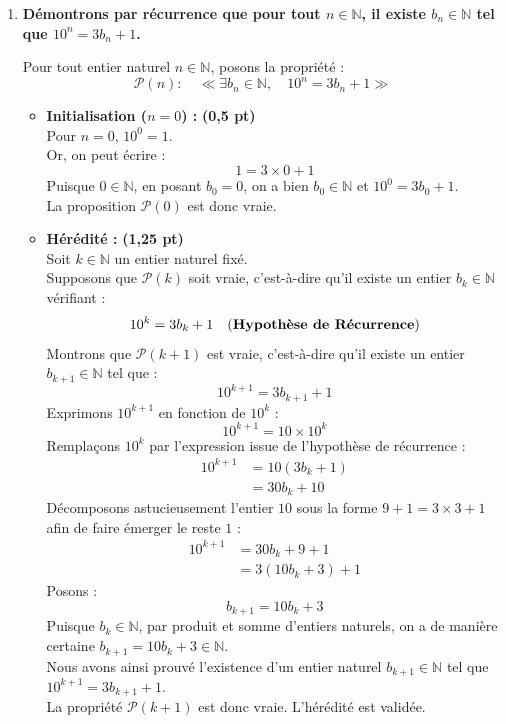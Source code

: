 \documentclass[11pt,a4paper]{article}
\newcommand{\bareme}[1]{\hfill\textbf{\textcolor{secondary}{\sffamily[#1]}}}
\newcommand{\pts}[1]{\textbf{\textcolor{secondary}{\sffamily(#1)}}}
\newcommand{\N}{\mathbb{N}}
\begin{document}
\begin{correctionbox}[Corrigé de l'Exercice 5 \bareme{Total : 4 points}]
\begin{enumerate}[label=\textbf{\arabic*.}]
    \item \textbf{Démontrons par récurrence que pour tout $n \in \N$, il existe $b_n \in \N$ tel que $10^n = 3b_n + 1$.} \bareme{2,0 pts}

    Pour tout entier naturel $n \in \N$, posons la propriété :
    \[
    \mathcal{P}(n) : \quad \ll \exists b_n \in \N, \quad 10^n = 3b_n + 1 \gg
    \]

    \begin{itemize}[leftmargin=*, label=$\bullet$]
        \item \textbf{Initialisation ($n = 0$) :} \pts{0,5 pt}\\
        Pour $n = 0$, $10^0 = 1$.\\
        Or, on peut écrire :
        \[
        1 = 3 \times 0 + 1
        \]
        Puisque $0 \in \N$, en posant $b_0 = 0$, on a bien $b_0 \in \N$ et $10^0 = 3b_0 + 1$.\\
        La proposition $\mathcal{P}(0)$ est donc vraie.

        \item \textbf{Hérédité :} \pts{1,25 pt}\\
        Soit $k \in \N$ un entier naturel fixé.\\
        Supposons que $\mathcal{P}(k)$ soit vraie, c'est-à-dire qu'il existe un entier $b_k \in \N$ vérifiant :
        \[
        10^k = 3b_k + 1 \quad \text{(\textbf{Hypothèse de Récurrence})}
        \]
        Montrons que $\mathcal{P}(k+1)$ est vraie, c'est-à-dire qu'il existe un entier $b_{k+1} \in \N$ tel que :
        \[
        10^{k+1} = 3b_{k+1} + 1
        \]
        Exprimons $10^{k+1}$ en fonction de $10^k$ :
        \[
        10^{k+1} = 10 \times 10^k
        \]
        Remplaçons $10^k$ par l'expression issue de l'hypothèse de récurrence :
        \begin{align*}
        10^{k+1} &= 10(3b_k + 1) \\
                 &= 30 b_k + 10
        \end{align*}
        Décomposons astucieusement l'entier $10$ sous la forme $9 + 1 = 3 \times 3 + 1$ afin de faire émerger le reste $1$ :
        \begin{align*}
        10^{k+1} &= 30 b_k + 9 + 1 \\
                 &= 3(10 b_k + 3) + 1
        \end{align*}
        Posons :
        \[
        b_{k+1} = 10 b_k + 3
        \]
        Puisque $b_k \in \N$, par produit et somme d'entiers naturels, on a de manière certaine $b_{k+1} = 10b_k + 3 \in \N$.\\
        Nous avons ainsi prouvé l'existence d'un entier naturel $b_{k+1} \in \N$ tel que $10^{k+1} = 3b_{k+1} + 1$.\\
        La propriété $\mathcal{P}(k+1)$ est donc vraie. L'hérédité est validée.


\end{itemize}
\end{enumerate}
\end{correctionbox}
\end{document}
